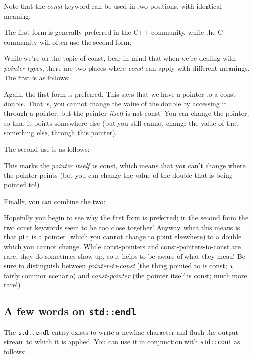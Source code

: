 \documentclass[a4paper]{scrartcl}
\begin{document}


Note that the \emph{const} keyword can be used in two positions, with identical meaning:



The first form is generally preferred in the C++ community, while the C community will often use the second form.

While we're on the topic of const, bear in mind that when we're dealing with \emph{pointer types}, there are two places where \emph{const} can apply with different meanings. The first is as follows:



Again, the first form is preferred. This says that we have a pointer to a const double. That is, you cannot change the value of the double by accessing it through a pointer, but the pointer \emph{itself} is not const! You can change the pointer, so that it points somewhere else (but you still cannot change the value of that something else, through this pointer).

The second use is as follows:



This marks the \emph{pointer itself} as const, which means that you can't change where the pointer points (but you can change the value of the double that is being pointed to!)

Finally, you can combine the two:



Hopefully you begin to see why the first form is preferred; in the second form the two const keywords seem to be too close together! Anyway, what this means is that \verb|ptr| is a pointer (which you cannot change to point elsewhere) to a double which you cannot change. While const-pointers and const-pointers-to-const are rare, they do sometimes show up, so it helps to be aware of what they mean! Be sure to distinguish between \emph{pointer-to-const} (the thing pointed to is const; a fairly common scenario) and \emph{const-pointer} (the pointer itself is const; much more rare!)

\subsection{A few words on \texttt{std::endl}}
The \verb|std::endl| entity exists to write a newline character and flush the output stream to which it is applied. You can use it in conjunction with \verb|std::cout| as follows:
\end{document}
